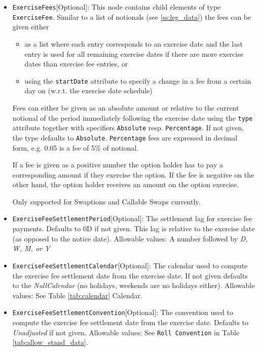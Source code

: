 \begin{itemize}
\item \lstinline!ExerciseFees![Optional]: This node contains child elements of type \lstinline!ExerciseFee!. Similar to a list of notionals
  (see \ref{ss:leg_data}) the fees can be given either

  \begin{itemize}
  \item as a list where each entry corresponds to an exercise date and the last entry is used for all remaining exercise
    dates if there are more exercise dates than exercise fee entries, or
  \item using the \verb+startDate+ attribute to specify a change in a fee from a certain day on (w.r.t. the exercise
    date schedule)
  \end{itemize}

  Fees can either be given as an absolute amount or relative to the current notional of the period immediately following
  the exercise date using the \verb+type+ attribute together with specifiers \verb+Absolute+ resp. \verb+Percentage+. If
  not given, the type defaults to \verb+Absolute+. \verb+Percentage+ fees are expressed in decimal form, e.g. 0.05 is a fee of 5\% of notional.

  If a fee is given as a positive number the option holder has to pay a corresponding amount if they exercise the
  option. If the fee is negative on the other hand, the option holder receives an amount on the option exercise.

  Only supported for Swaptions and Callable Swaps currently.

\item \lstinline!ExerciseFeeSettlementPeriod![Optional]: The settlement lag for exercise fee payments. Defaults to 0D if not
  given. This lag is relative to the exercise date (as opposed to the notice date). Allowable values: A number followed by \emph{D, W, M, or Y}

\item \lstinline!ExerciseFeeSettlementCalendar![Optional]: The calendar used to compute the exercise fee settlement date from the
  exercise date. If not given defaults to the \emph{NullCalendar} (no holidays, weekends are no holidays either). Allowable values: See Table \ref{tab:calendar} Calendar.

\item \lstinline!ExerciseFeeSettlementConvention![Optional]: The convention used to compute the exercise fee settlement date from
  the exercise date. Defaults to \emph{Unadjusted} if not given. Allowable values: See \lstinline!Roll Convention! in Table \ref{tab:allow_stand_data}.


\end{itemize}
